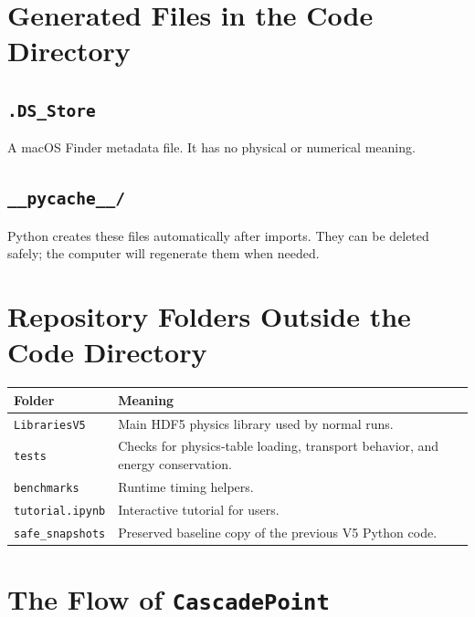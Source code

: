 \documentclass[11pt]{article}
\newcommand{\code}[1]{\texttt{#1}}
\begin{document}
\section{Generated Files in the Code Directory}

\subsection{\code{.DS\_Store}}

A macOS Finder metadata file. It has no physical or numerical meaning.

\subsection{\code{\_\_pycache\_\_/}}

Python creates these files automatically after imports. They can be deleted
safely; the computer will regenerate them when needed.

\section{Repository Folders Outside the Code Directory}

\begin{center}
\begin{tabularx}{0.96\linewidth}{@{}lX@{}}
\toprule
\textbf{Folder} & \textbf{Meaning} \\
\midrule
\code{LibrariesV5} & Main HDF5 physics library used by normal runs. \\
\code{tests} & Checks for physics-table loading, transport behavior, and energy conservation. \\
\code{benchmarks} & Runtime timing helpers. \\
\code{tutorial.ipynb} & Interactive tutorial for users. \\
\code{safe\_snapshots} & Preserved baseline copy of the previous V5 Python code. \\
\bottomrule
\end{tabularx}
\end{center}

\section{The Flow of \code{CascadePoint}}
\end{document}
